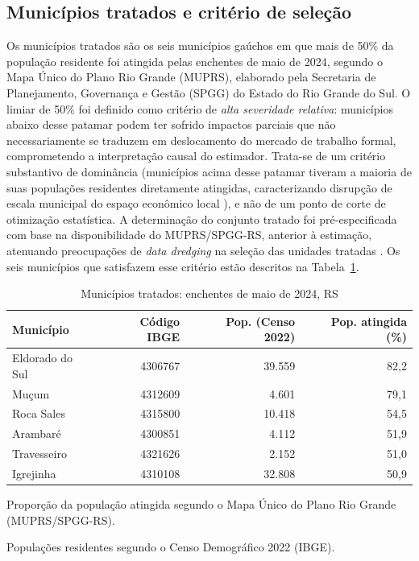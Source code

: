 \documentclass[a4paper,12pt]{article}
\begin{document}
\subsection{Municípios tratados e critério de seleção}
\label{sub:tratados}

Os municípios tratados são os seis municípios gaúchos em que mais de 50\% da
população residente foi atingida pelas enchentes de maio de 2024, segundo o Mapa
Único do Plano Rio Grande (MUPRS), elaborado pela Secretaria de Planejamento,
Governança e Gestão (SPGG) do Estado do Rio Grande do Sul.
O limiar de 50\% foi definido como critério de \emph{alta severidade relativa}: municípios
abaixo desse patamar podem ter sofrido impactos parciais que não necessariamente se
traduzem em deslocamento do mercado de trabalho formal, comprometendo a
interpretação causal do estimador. Trata-se de um critério substantivo de dominância
(municípios acima desse patamar tiveram a maioria de suas populações residentes
diretamente atingidas, caracterizando disrupção de escala municipal do espaço econômico
local \cite{cavallo2013}), e não de um ponto de corte de otimização estatística.
A determinação do conjunto tratado foi pré-especificada com base na disponibilidade
do MUPRS/SPGG-RS, anterior à estimação, atenuando preocupações de \textit{data
dredging} na seleção das unidades tratadas \cite{angrist2009}. Os seis municípios que
satisfazem esse critério estão descritos na Tabela~\ref{tab:municipios_tratados}.

\begin{table}[htbp]
\centering
\caption{Municípios tratados: enchentes de maio de 2024, RS}
\label{tab:municipios_tratados}
\begin{threeparttable}
\small
\begin{tabular}{l r r r}
\toprule
Município & Código IBGE & Pop. (Censo 2022) & Pop. atingida (\%) \\
\midrule
Eldorado do Sul & 4306767 & 39.559 & 82{,}2 \\
Mu\c{c}um       & 4312609 &  4.601 & 79{,}1 \\
Roca Sales      & 4315800 & 10.418 & 54{,}5 \\
Arambaré        & 4300851 &  4.112 & 51{,}9 \\
Travesseiro     & 4321626 &  2.152 & 51{,}0 \\
Igrejinha       & 4310108 & 32.808 & 50{,}9 \\
\bottomrule
\end{tabular}
\begin{tablenotes}[flushleft]
\footnotesize
\item Proporção da população atingida segundo o Mapa Único do Plano Rio Grande (MUPRS/SPGG-RS).
\item Populações residentes segundo o Censo Demográfico 2022 (IBGE).
\end{tablenotes}
\end{threeparttable}
\end{table}
\end{document}

